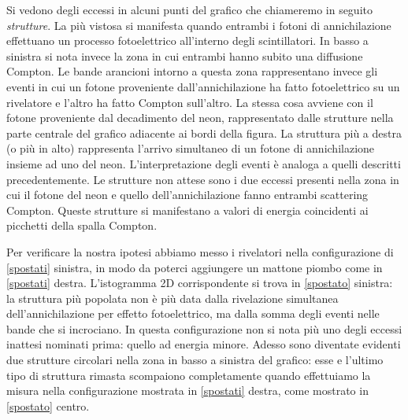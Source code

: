Si vedono degli eccessi in alcuni punti del grafico che chiameremo in seguito \emph{strutture}. La più vistosa si manifesta quando entrambi i fotoni di annichilazione effettuano un processo fotoelettrico all'interno degli scintillatori. In basso a sinistra si nota invece la zona in cui entrambi hanno subito una diffusione Compton. Le bande arancioni intorno a questa zona rappresentano invece gli eventi in cui un fotone proveniente dall'annichilazione ha fatto fotoelettrico su un rivelatore e l'altro ha fatto Compton sull'altro.
La stessa cosa avviene con il fotone proveniente dal decadimento del neon, rappresentato dalle strutture nella parte centrale del grafico adiacente ai bordi della figura. La struttura più a destra (o più in alto) rappresenta l'arrivo simultaneo di un fotone di annichilazione insieme ad uno del neon. L'interpretazione degli eventi è analoga a quelli descritti precedentemente.
Le strutture non attese sono i due eccessi presenti nella zona in cui il fotone del neon e quello dell'annichilazione fanno entrambi scattering Compton. Queste strutture si manifestano a valori di energia coincidenti ai picchetti della spalla Compton.

Per verificare la nostra ipotesi abbiamo messo i rivelatori nella configurazione di \autoref{spostati} sinistra, in modo da poterci aggiungere un mattone piombo come in \autoref{spostati} destra.
L'istogramma 2D corrispondente si trova in \autoref{spostato} sinistra: la struttura più popolata non è più data dalla rivelazione simultanea dell'annichilazione per effetto fotoelettrico, ma dalla somma degli eventi nelle bande che si incrociano.
In questa configurazione non si nota più uno degli eccessi inattesi nominati prima: quello ad energia minore.
Adesso sono diventate evidenti due strutture circolari nella zona in basso a sinistra del grafico: esse e l'ultimo tipo di struttura rimasta scompaiono completamente quando effettuiamo la misura nella configurazione mostrata in \autoref{spostati} destra, come mostrato in \autoref{spostato} centro.

